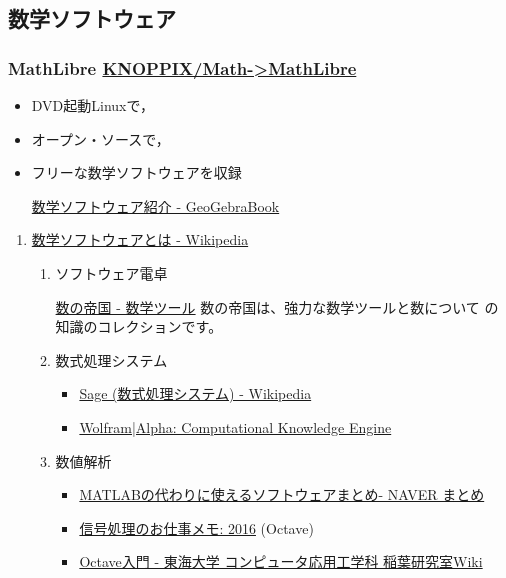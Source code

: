 \documentclass[dvipdfmx,11pat]{jarticle}
\begin{document}
\subsection{数学ソフトウェア}
\label{sec:org3daffb0}
\subsubsection{MathLibre  \href{https://www.geogebra.org/m/hShSTr6e}{KNOPPIX/Math->MathLibre}}
\label{sec:org51cb082}
\begin{itemize}
\item DVD起動Linuxで，

\item オープン・ソースで，

\item フリーな数学ソフトウェアを収録 

\href{https://www.geogebra.org/m/hShSTr6e}{数学ソフトウェア紹介 - GeoGebraBook}
\end{itemize}

\begin{enumerate}
\item \href{https://ja.wikipedia.org/wiki/\%E6\%95\%B0\%E5\%AD\%A6\%E3\%82\%BD\%E3\%83\%95\%E3\%83\%88\%E3\%82\%A6\%E3\%82\%A7\%E3\%82\%A2}{数学ソフトウェアとは - Wikipedia}
\label{sec:org60ba49a}

\begin{enumerate}
\item ソフトウェア電卓  

\href{http://ja.numberempire.com/}{数の帝国 - 数学ツール} 数の帝国は、強力な数学ツールと数について
の知識のコレクションです。

\item 数式処理システム

\begin{itemize}
\item \href{https://ja.wikipedia.org/wiki/Sage\_(\%E6\%95\%B0\%E5\%BC\%8F\%E5\%87\%A6\%E7\%90\%86\%E3\%82\%B7\%E3\%82\%B9\%E3\%83\%86\%E3\%83\%A0)}{Sage (数式処理システム) - Wikipedia}

\item \href{http://www.wolframalpha.com/}{Wolfram|Alpha: Computational Knowledge Engine}
\end{itemize}

\item 数値解析
\begin{itemize}
\item \href{https://matome.naver.jp/odai/2136163231573327601}{MATLABの代わりに使えるソフトウェアまとめ- NAVER まとめ}
\item \href{http://signalprocessor.blogspot.jp/2016/}{信号処理のお仕事メモ: 2016} (Octave)
\item \href{http://www.inaba-lab.org/wiki/index.php/Octave\%E5\%85\%A5\%E9\%96\%80}{Octave入門 - 東海大学 コンピュータ応用工学科 稲葉研究室Wiki}
\end{itemize}
\end{enumerate}
\end{enumerate}
\end{document}
